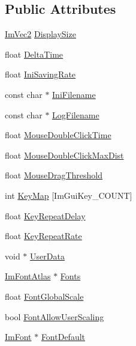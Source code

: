 \subsection*{Public Attributes}
\begin{DoxyCompactItemize}
\item 
\hyperlink{struct_im_vec2}{Im\+Vec2} \hyperlink{struct_im_gui_i_o_a042cfb90bdc9ccfe37f86b92ade759fd}{Display\+Size}
\item 
float \hyperlink{struct_im_gui_i_o_a5068d5414a19c2a1bf58029bd732a7c7}{Delta\+Time}
\item 
float \hyperlink{struct_im_gui_i_o_a9b37eea17baa240a93b1288673a6eeb9}{Ini\+Saving\+Rate}
\item 
const char $\ast$ \hyperlink{struct_im_gui_i_o_a89e8efe8f82b539c961dc22cc2499402}{Ini\+Filename}
\item 
const char $\ast$ \hyperlink{struct_im_gui_i_o_ae77a1beed11820366800645232a6ad1c}{Log\+Filename}
\item 
float \hyperlink{struct_im_gui_i_o_aee056f6ed15363e0bcd8d879b312da7c}{Mouse\+Double\+Click\+Time}
\item 
float \hyperlink{struct_im_gui_i_o_a13334c1522aadc12af0ce3b31b0eb3a1}{Mouse\+Double\+Click\+Max\+Dist}
\item 
float \hyperlink{struct_im_gui_i_o_ad8b9a9924b0d6bde6a0fa35c17aa54ae}{Mouse\+Drag\+Threshold}
\item 
int \hyperlink{struct_im_gui_i_o_aa1cd0083960f8e5361eb6d49973c8823}{Key\+Map} \mbox{[}Im\+Gui\+Key\+\_\+\+C\+O\+U\+NT\mbox{]}
\item 
float \hyperlink{struct_im_gui_i_o_a390537e7cba21b98a8f89df857ea59fb}{Key\+Repeat\+Delay}
\item 
float \hyperlink{struct_im_gui_i_o_accd71987c895c4aec6d1a8c368cc9e0e}{Key\+Repeat\+Rate}
\item 
void $\ast$ \hyperlink{struct_im_gui_i_o_a8c5e74fd39c2655455329e09529da7d3}{User\+Data}
\item 
\hyperlink{struct_im_font_atlas}{Im\+Font\+Atlas} $\ast$ \hyperlink{struct_im_gui_i_o_a24e4f5201fe8780267abc2acfc24254c}{Fonts}
\item 
float \hyperlink{struct_im_gui_i_o_a74a64a74dcbe2a6ef0c1ef56ba328094}{Font\+Global\+Scale}
\item 
bool \hyperlink{struct_im_gui_i_o_af5fc6eae7ce68cce8473f006431f530e}{Font\+Allow\+User\+Scaling}
\item 
\hyperlink{struct_im_font}{Im\+Font} $\ast$ \hyperlink{struct_im_gui_i_o_a11016e4aefa603523bce61315b66bf00}{Font\+Default}

\end{DoxyCompactItemize}
